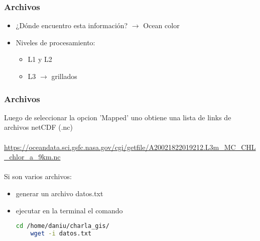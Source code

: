\documentclass{beamer}
\begin{document}
\begin{frame}[t]
\frametitle{Archivos}

\begin{itemize}
	\item<1->[] ¿Dónde encuentro esta información? $\rightarrow$ Ocean color \href{https://oceancolor.gsfc.nasa.gov/}{}

	\item<2->[] Niveles de procesamiento:
\begin{itemize}
	\item L1 y L2
	\item L3 $\rightarrow$ grillados 
\end{itemize}

   \begin{figure}
	
	
   \end{figure}

\end{itemize}
\end{frame}


\begin{frame}[fragile]
\frametitle{Archivos}

Luego de seleccionar la opcion 'Mapped' uno obtiene una lista de links de archivos netCDF (.nc)
\\~\\
\url{https://oceandata.sci.gsfc.nasa.gov/cgi/getfile/A20021822019212.L3m_MC_CHL_chlor_a_9km.nc} \href{https://oceandata.sci.gsfc.nasa.gov/cgi/getfile/A20021822019212.L3m_MC_CHL_chlor_a_9km.nc}{}
\\~\\

\pause
Si son varios archivos:
\begin{itemize}
	\item generar un archivo datos.txt 
	\item ejecutar en la terminal el comando 
	
	\begin{lstlisting}[language=bash, basicstyle=\scriptsize]
	cd /home/daniu/charla_gis/
	wget -i datos.txt  
	\end{lstlisting}
\end{itemize}

\end{frame}
\end{document}
